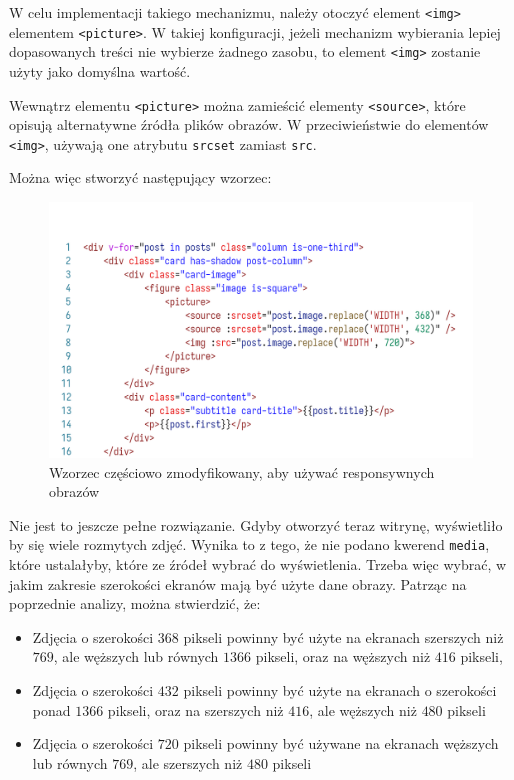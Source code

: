 \documentclass[licencjacka]{pracadypl}
\begin{document}
W celu implementacji takiego mechanizmu, należy otoczyć element \texttt{<img>} elementem \texttt{<picture>}. W takiej konfiguracji, jeżeli mechanizm wybierania lepiej dopasowanych treści nie wybierze żadnego zasobu, to element \texttt{<img>} zostanie użyty jako domyślna wartość.

Wewnątrz elementu \texttt{<picture>} można zamieścić elementy \texttt{<source>}, które opisują alternatywne źródła plików obrazów. W przeciwieństwie do elementów \texttt{<img>}, używają one atrybutu \texttt{srcset} zamiast \texttt{src}.

Można więc stworzyć następujący wzorzec:

\begin{figure}[H]
  \centering
  \includegraphics[width=\linewidth]{images/code-vue-image-card-mid.png}
  \caption{Wzorzec częściowo zmodyfikowany, aby używać responsywnych obrazów}
  \label{fig:code-vue-template-articles-mid}
\end{figure}

Nie jest to jeszcze pełne rozwiązanie. Gdyby otworzyć teraz witrynę, wyświetliło by się wiele rozmytych zdjęć. Wynika to z tego, że nie podano kwerend \texttt{media}, które ustalałyby, które ze źródeł wybrać do wyświetlenia. Trzeba więc wybrać, w jakim zakresie szerokości ekranów mają być użyte dane obrazy. Patrząc na poprzednie analizy, można stwierdzić, że:

\begin{itemize}
  \item Zdjęcia o szerokości $368$ pikseli powinny być użyte na ekranach szerszych niż $769$, ale węższych lub równych $1366$ pikseli, oraz na węższych niż $416$ pikseli,
  \item Zdjęcia o szerokości $432$ pikseli powinny być użyte na ekranach o szerokości ponad $1366$ pikseli, oraz na szerszych niż $416$, ale węższych niż $480$ pikseli
  \item Zdjęcia o szerokości $720$ pikseli powinny być używane na ekranach węższych lub równych $769$, ale szerszych niż $480$ pikseli
\end{itemize}
\end{document}
